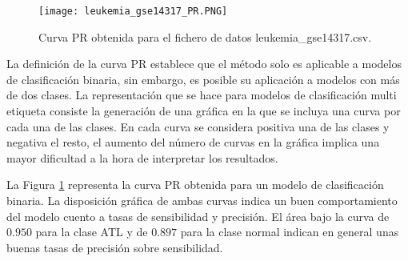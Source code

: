 \bigbreak

\begin{figure}[htp]
    \centering
    \texttt{[image: leukemia\_gse14317\_PR.PNG]}
    \caption{Curva PR obtenida para el fichero de datos leukemia\_gse14317.csv.}
    \label{fig:6}
\end{figure}

La definición de la curva PR establece que el método solo es aplicable a modelos de clasificación binaria, sin embargo, es posible su aplicación a modelos con más de dos clases. La representación que se hace para modelos de clasificación multi etiqueta consiste la generación de una gráfica en la que se incluya una curva por cada una de las clases. En cada curva se considera positiva una de las clases y negativa el resto, el aumento del número de curvas en la gráfica implica una mayor dificultad a la hora de interpretar los resultados.

\bigbreak

La Figura \ref{fig:6} representa la curva PR obtenida para un modelo de clasificación binaria. La disposición gráfica de ambas curvas indica un buen comportamiento del modelo cuento a tasas de sensibilidad y precisión. El área bajo la curva de $0.950$ para la clase ATL y de $0.897$ para la clase normal indican en general unas buenas tasas de precisión sobre sensibilidad.

\clearpage